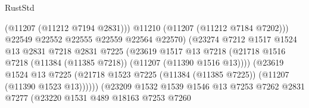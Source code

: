 \begin{lexlean}{RustStd}
\begin{coremodule}
                                              (@11207 (@11212 @7194 @2831)))
                                            @11210
                                            (@11207 (@11212 @7184 @7202)))
                                          @22549
                                          @22552
                                          @22555
                                          @22559
                                          @22564
                                          @22570)
                                        (@23274
                                          @7212
                                          @1517
                                          @1524
                                          @13
                                          @2831
                                          @7218
                                          @2831
                                          @7225
                                          (@23619
                                            @1517
                                            @13
                                            @7218
                                            (@21718
                                              @1516
                                              @7218
                                              (@11384 (@11385 @7218))
                                              (@11207 (@11390 @1516 @13))))
                                          (@23619
                                            @1524
                                            @13
                                            @7225
                                            (@21718
                                              @1523
                                              @7225
                                              (@11384 (@11385 @7225))
                                              (@11207 (@11390 @1523 @13))))))
                                      (@23209
                                        @1532
                                        @1539
                                        @1546
                                        @13
                                        @7253
                                        @7262
                                        @2831
                                        @7277
                                        (@23220
                                          @1531
                                          @489
                                          @18163
                                          @7253
                                          @7260

\end{coremodule}
\end{lexlean}
